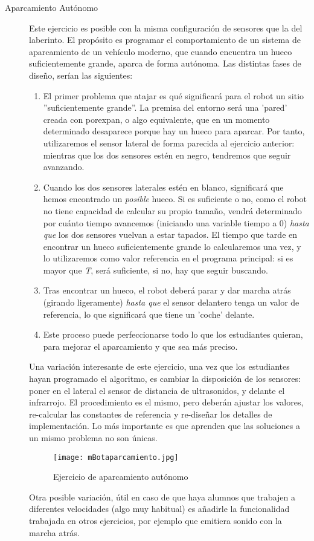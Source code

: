 \begin{description}
	\item [Aparcamiento Autónomo] \label{ej:aparcamiento}
	Este ejercicio es posible con la misma configuración de sensores que la del laberinto. El propósito es programar el comportamiento de un sistema de aparcamiento de un vehículo moderno, que cuando encuentra un hueco suficientemente grande, aparca de forma autónoma. Las distintas fases de diseño, serían las siguientes:
	\begin{enumerate}
		\item El primer problema que atajar es qué significará para el robot un sitio ''suficientemente grande''. La premisa del entorno será una 'pared' creada con porexpan, o algo equivalente, que en un momento determinado desaparece porque hay un hueco para aparcar. Por tanto, utilizaremos el sensor lateral de forma parecida al ejercicio anterior: mientras que los dos sensores estén en negro, tendremos que seguir avanzando.
		\item Cuando los dos sensores laterales estén en blanco, significará que hemos encontrado un \textit{posible} hueco. Si es suficiente o no, como el robot no tiene capacidad de calcular su propio tamaño, vendrá determinado por cuánto tiempo avancemos (iniciando una variable tiempo a 0) \textit{hasta que} los dos sensores vuelvan a estar tapados. El tiempo que tarde en encontrar un hueco suficientemente grande lo calcularemos una vez, y lo utilizaremos como valor referencia en el programa principal: si es mayor que \textit{T}, será suficiente, si no, hay que seguir buscando.
		\item Tras encontrar un hueco, el robot deberá parar y dar marcha atrás (girando ligeramente) \textit{hasta que} el sensor delantero tenga un valor de referencia, lo que significará que tiene un 'coche' delante. 
		\item Este proceso puede perfeccionarse todo lo que los estudiantes quieran, para mejorar el aparcamiento y que sea más preciso.		
	\end{enumerate}
	Una variación interesante de este ejercicio, una vez que los estudiantes hayan programado el algoritmo, es cambiar la disposición de los sensores: poner en el lateral el sensor de distancia de ultrasonidos, y delante el infrarrojo. El procedimiento es el mismo, pero deberán ajustar los valores, re-calcular las constantes de referencia y re-diseñar los detalles de implementación. Lo más importante es que aprenden que las soluciones a un mismo problema no son únicas.
	\begin{figure}[H]
		\texttt{[image: mBotaparcamiento.jpg]}
		\centering
		\label{img:mBotaparcamiento}
		\caption{Ejercicio de aparcamiento autónomo}
	\end{figure}
	Otra posible variación, útil en caso de que haya alumnos que trabajen a diferentes velocidades (algo muy habitual) es añadirle la funcionalidad trabajada en otros ejercicios, por ejemplo que emitiera sonido con la marcha atrás.
\end{description}



